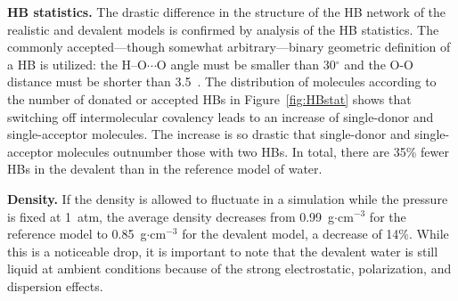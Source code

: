 \documentclass[aps,prl,reprint,amsmath,amssymb]{revtex4-1}
\begin{document}

 
\textbf{HB statistics.} The drastic difference in the structure of the HB network of the realistic and devalent models is confirmed by analysis of the HB statistics. 
The commonly accepted---though somewhat arbitrary---binary geometric definition of a HB is utilized: the H--O$\cdots$O angle must be smaller than 30$^{\circ}$ and the O-O distance must be shorter than 3.5\Ang~\cite{rey2002hydrogen,lawrence2003vibrational}. 
The distribution of molecules according to the number of donated or accepted HBs in Figure~\ref{fig:HBstat} shows that switching off intermolecular covalency leads to an increase of single-donor and single-acceptor molecules. 
The increase is so drastic that single-donor and single-acceptor molecules outnumber those with two HBs.
In total, there are 35\% fewer HBs in the devalent than in the reference model of water.

\textbf{Density.} If the density is allowed to fluctuate in a simulation while the pressure is fixed at 1~atm, the average density decreases from 0.99~g$\cdot$cm$^{-3}$ for the reference model to 0.85~g$\cdot$cm$^{-3}$ for the devalent model, a decrease of 14\%. 
While this is a noticeable drop, it is important to note that the devalent water is still liquid at ambient conditions because of the strong electrostatic, polarization, and dispersion effects. 
\end{document}
